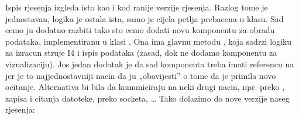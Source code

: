 \documentclass[letterpaper,10pt,croatian]{sphinxmanual}
\begin{document}
\begin{sphinxVerbatim}[commandchars=\\\{\}]
  
      
     
     


 


   
\end{sphinxVerbatim}

\sphinxAtStartPar
Ispis rjesenja izgleda isto kao i kod ranije verzije rjesenja. Razlog tome je
jednostavan, logika je ostala ista, samo je cijela petlja prebacena u
 klasu. Sad cemo ju dodatno razbiti tako sto cemo dodati novu
komponentu za obradu podataka, implementiranu u klasi . Ona ima
glavnu metodu , koja sadrzi logiku za izracun struje I4 i ispis
podataka (zasad, dok ne dodamo komponentu za vizualizaciju). Jos jedan dodatak
je da sad  komponenta treba imati referencu na 
jer je to najjednostavniji nacin da ju „obavijesti” o tome da je primila novo
ocitanje. Alternativa bi bila da komuniciraju na neki drugi nacin, npr. preko
, zapisa
i citanja datoteke, preko socketa, … Tako dolazimo do nove verzije naseg
rjesenja:
\end{document}
